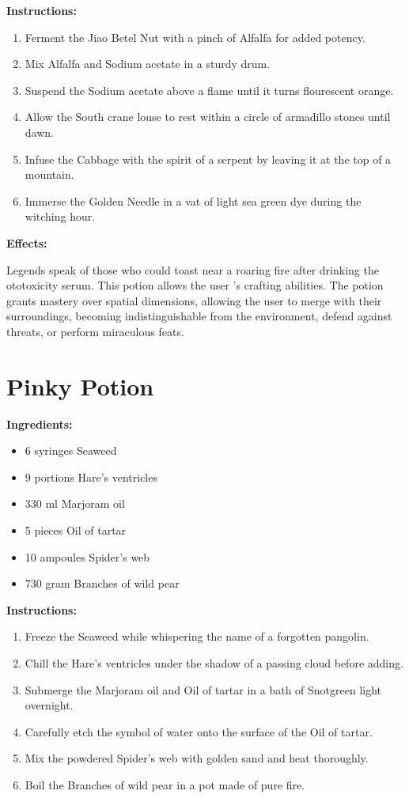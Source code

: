 \documentclass{article}
\begin{document}
\textbf{Instructions:}

\begin{enumerate}
  \item Ferment the Jiao Betel Nut with a pinch of Alfalfa for added potency.
  \item Mix Alfalfa and Sodium acetate in a sturdy drum.
  \item Suspend the Sodium acetate above a flame until it turns flourescent orange.
  \item Allow the South crane louse to rest within a circle of armadillo stones until dawn.
  \item Infuse the Cabbage with the spirit of a serpent by leaving it at the top of a mountain.
  \item Immerse the Golden Needle in a vat of light sea green dye during the witching hour.
\end{enumerate}

\textbf{Effects:}

Legends speak of those who could toast near a roaring fire after drinking the ototoxicity serum. This potion allows the user 's crafting abilities. The potion grants mastery over spatial dimensions, allowing the user to merge with their surroundings, becoming indistinguishable from the environment, defend against threats, or perform miraculous feats.

\newpage
\section*{Pinky Potion}

\textbf{Ingredients:}

\begin{itemize}
  \item 6 syringes Seaweed
  \item 9 portions Hare's ventricles
  \item 330 ml Marjoram oil
  \item 5 pieces Oil of tartar
  \item 10 ampoules Spider's web
  \item 730 gram Branches of wild pear
\end{itemize}

\textbf{Instructions:}

\begin{enumerate}
  \item Freeze the Seaweed while whispering the name of a forgotten pangolin.
  \item Chill the Hare's ventricles under the shadow of a passing cloud before adding.
  \item Submerge the Marjoram oil and Oil of tartar in a bath of Snotgreen light overnight.
  \item Carefully etch the symbol of water onto the surface of the Oil of tartar.
  \item Mix the powdered Spider's web with golden sand and heat thoroughly.
  \item Boil the Branches of wild pear in a pot made of pure fire.
\end{enumerate}
\end{document}
